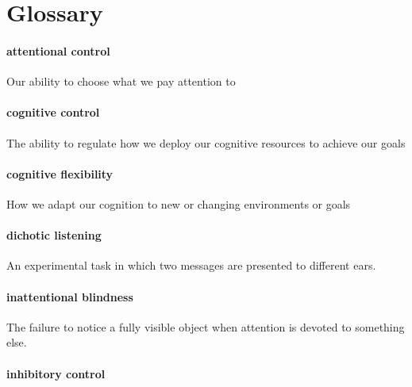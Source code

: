 \documentclass[
]{krantz}
\begin{document}
\section{Glossary}\label{glossary-2}

\paragraph*{attentional control}\label{attentional-control}

Our ability to choose what we pay attention to

\paragraph*{cognitive control}\label{cognitive-control}

The ability to regulate how we deploy our cognitive resources to achieve our goals

\paragraph*{cognitive flexibility}\label{cognitive-flexibility}

How we adapt our cognition to new or changing environments or goals

\paragraph*{dichotic listening}\label{dichotic-listening}

An experimental task in which two messages are presented to different ears.

\paragraph*{inattentional blindness}\label{inattentional-blindness}

The failure to notice a fully visible object when attention is devoted to something else.

\paragraph*{inhibitory control}\label{inhibitory-control}
\end{document}
